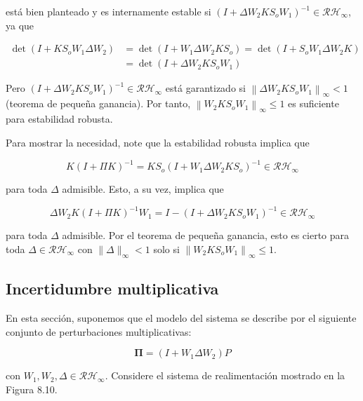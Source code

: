 está bien planteado y es internamente estable si $\left(I+\Delta W_{2} K S_{o} W_{1}\right)^{-1} \in \mathcal{R} \mathcal{H}_{\infty}$, ya que

$$
\begin{aligned}
\operatorname{det}\left(I+K S_{o} W_{1} \Delta W_{2}\right) & =\operatorname{det}\left(I+W_{1} \Delta W_{2} K S_{o}\right)=\operatorname{det}\left(I+S_{o} W_{1} \Delta W_{2} K\right) \\
& =\operatorname{det}\left(I+\Delta W_{2} K S_{o} W_{1}\right)
\end{aligned}
$$

Pero $\left(I+\Delta W_{2} K S_{o} W_{1}\right)^{-1} \in \mathcal{R} \mathcal{H}_{\infty}$ está garantizado si $\left\|\Delta W_{2} K S_{o} W_{1}\right\|_{\infty}<1$ (teorema de pequeña ganancia). Por tanto, $\left\|W_{2} K S_{o} W_{1}\right\|_{\infty} \leq 1$ es suficiente para estabilidad robusta.

Para mostrar la necesidad, note que la estabilidad robusta implica que

$$
K(I+\Pi K)^{-1}=K S_{o}\left(I+W_{1} \Delta W_{2} K S_{o}\right)^{-1} \in \mathcal{R} \mathcal{H}_{\infty}
$$

para toda $\Delta$ admisible. Esto, a su vez, implica que

$$
\Delta W_{2} K(I+\Pi K)^{-1} W_{1}=I-\left(I+\Delta W_{2} K S_{o} W_{1}\right)^{-1} \in \mathcal{R} \mathcal{H}_{\infty}
$$

para toda $\Delta$ admisible. Por el teorema de pequeña ganancia, esto es cierto para toda $\Delta \in \mathcal{R} \mathcal{H}_{\infty}$ con $\|\Delta\|_{\infty}<1$ solo si $\left\|W_{2} K S_{o} W_{1}\right\|_{\infty} \leq 1$.


\subsection*{Incertidumbre multiplicativa}
En esta sección, suponemos que el modelo del sistema se describe por el siguiente conjunto de perturbaciones multiplicativas:

$$
\boldsymbol{\Pi}=\left(I+W_{1} \Delta W_{2}\right) P
$$

con $W_{1}, W_{2}, \Delta \in \mathcal{R} \mathcal{H}_{\infty}$. Considere el sistema de realimentación mostrado en la Figura 8.10.

